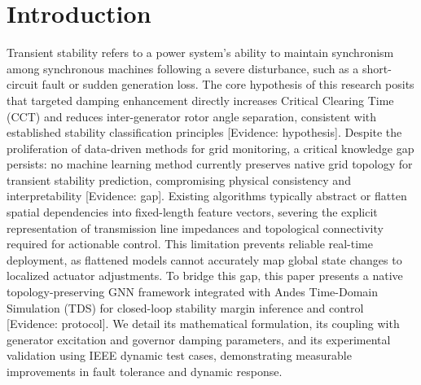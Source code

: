 \documentclass[11pt,a4paper]{article}
\begin{document}
\section{Introduction}
Transient stability refers to a power system's ability to maintain synchronism among synchronous machines following a severe disturbance, such as a short-circuit fault or sudden generation loss. The core hypothesis of this research posits that targeted damping enhancement directly increases Critical Clearing Time (CCT) and reduces inter-generator rotor angle separation, consistent with established stability classification principles [Evidence: hypothesis]. Despite the proliferation of data-driven methods for grid monitoring, a critical knowledge gap persists: no machine learning method currently preserves native grid topology for transient stability prediction, compromising physical consistency and interpretability [Evidence: gap]. Existing algorithms typically abstract or flatten spatial dependencies into fixed-length feature vectors, severing the explicit representation of transmission line impedances and topological connectivity required for actionable control. This limitation prevents reliable real-time deployment, as flattened models cannot accurately map global state changes to localized actuator adjustments. To bridge this gap, this paper presents a native topology-preserving GNN framework integrated with Andes Time-Domain Simulation (TDS) for closed-loop stability margin inference and control [Evidence: protocol]. We detail its mathematical formulation, its coupling with generator excitation and governor damping parameters, and its experimental validation using IEEE dynamic test cases, demonstrating measurable improvements in fault tolerance and dynamic response.
\end{document}
